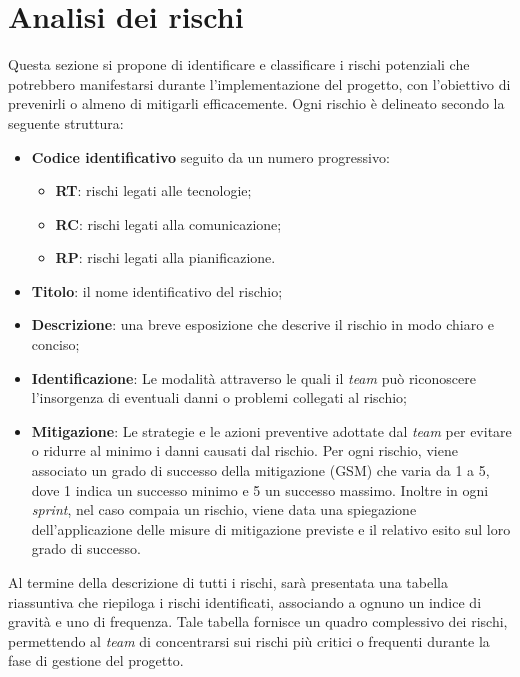 \section{Analisi dei rischi}

Questa sezione si propone di identificare e classificare i rischi potenziali 
che potrebbero manifestarsi durante l'implementazione del progetto, 
con l'obiettivo di prevenirli o almeno di mitigarli efficacemente. 
Ogni rischio è delineato secondo la seguente struttura:
\begin{itemize}
	\item \textbf{Codice identificativo} seguito da un numero progressivo:
	      \begin{itemize}
		      \item \textbf{RT}: rischi legati alle tecnologie;
		      \item \textbf{RC}: rischi legati alla comunicazione;
		      \item \textbf{RP}: rischi legati alla pianificazione.
	      \end{itemize}

		  
	\item \textbf{Titolo}: il nome identificativo del rischio;

	\item \textbf{Descrizione}: una breve esposizione che descrive il rischio in modo chiaro e conciso;

	\item \textbf{Identificazione}: Le modalità attraverso le quali il \textit{team} può riconoscere 
		l'insorgenza di eventuali danni o problemi collegati al rischio;

	\item \textbf{Mitigazione}: Le strategie e le azioni preventive adottate dal 
		\textit{team} per evitare o ridurre al minimo i danni causati dal rischio. Per ogni rischio, 
		viene associato un grado di successo della mitigazione (GSM) che varia da 1 a 5, dove 1 indica un successo minimo e 5 un successo massimo.
		Inoltre in ogni \textit{sprint}, nel caso compaia un rischio, viene data una spiegazione 
		dell'applicazione delle misure di mitigazione previste e il relativo esito sul loro grado di successo.
\end{itemize}

Al termine della descrizione di tutti i rischi, sarà presentata una tabella riassuntiva 
che riepiloga i rischi identificati, associando a ognuno un indice di gravità e uno di frequenza. 
Tale tabella fornisce un quadro complessivo dei rischi, 
permettendo al \textit{team} di concentrarsi sui rischi più critici o 
frequenti durante la fase di gestione del progetto.


